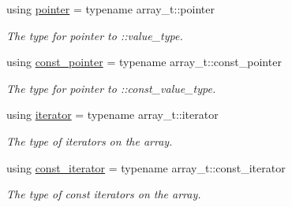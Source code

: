 \begin{DoxyCompactItemize}
using \hyperlink{group__Types_gadfa9e253e7692c86d9fa4386cebf9459}{pointer} = typename array\-\_\-t\-::pointer
\begin{DoxyCompactList}\small\item\em The type for pointer to \-::value\-\_\-type. \end{DoxyCompactList}\item 
using \hyperlink{group__Types_gaf7a2ac6cd741ccfb7bbb1378fbc85218}{const\-\_\-pointer} = typename array\-\_\-t\-::const\-\_\-pointer
\begin{DoxyCompactList}\small\item\em The type for pointer to \-::const\-\_\-value\-\_\-type. \end{DoxyCompactList}\item 
using \hyperlink{group__Types_ga7b1db0deafc45673f50da5aacb8c372c}{iterator} = typename array\-\_\-t\-::iterator
\begin{DoxyCompactList}\small\item\em The type of iterators on the array. \end{DoxyCompactList}\item 
using \hyperlink{group__Types_ga2c50f8cbc96829f139f8138f1bac40bf}{const\-\_\-iterator} = typename array\-\_\-t\-::const\-\_\-iterator
\begin{DoxyCompactList}\small\item\em The type of const iterators on the array. \end{DoxyCompactList}\end{DoxyCompactItemize}
